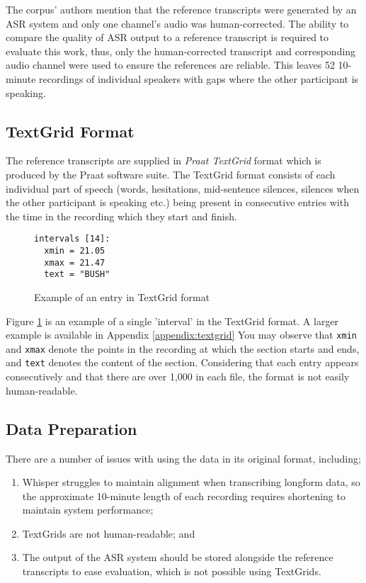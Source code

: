 The corpus' authors mention that the reference transcripts were generated by an ASR system and only one channel's audio was human-corrected.
The ability to compare the quality of ASR output to a reference transcript is required to evaluate this work, thus, only the human-corrected transcript and corresponding audio channel were used to ensure the references are reliable.
This leaves 52 10-minute recordings of individual speakers with gaps where the other participant is speaking.

\subsection{TextGrid Format}

The reference transcripts are supplied in \emph{Praat TextGrid} format which is produced by the Praat software suite\cite{praat}.
The TextGrid format consists of each individual part of speech (words, hesitations, mid-sentence silences, silences when the other participant is speaking etc.) being present in consecutive entries with the time in the recording which they start and finish.

\begin{figure}[h!]
\centering
\begin{BVerbatim}
intervals [14]:
  xmin = 21.05 
  xmax = 21.47 
  text = "BUSH" 
\end{BVerbatim}
  \caption{Example of an entry in TextGrid format}
  \label{fig:textgrid-example}
\end{figure}

Figure \ref{fig:textgrid-example} is an example of a single 'interval' in the TextGrid format.
A larger example is available in Appendix \ref{appendix:textgrid}
You may observe that \texttt{xmin} and \texttt{xmax} denote the points in the recording at which the section starts and ends, and \texttt{text} denotes the content of the section.
Considering that each entry appears consecutively and that there are over 1,000 in each file, the format is not easily human-readable.

\subsection{Data Preparation}

There are a number of issues with using the data in its original format, including;

\begin{enumerate}
  \item Whisper struggles to maintain alignment when transcribing longform data\cite{whisper}, so the approximate 10-minute length of each recording requires shortening to maintain system performance;
  \item TextGrids are not human-readable; and
  \item The output of the ASR system should be stored alongside the reference transcripts to ease evaluation, which is not possible using TextGrids.
\end{enumerate}

